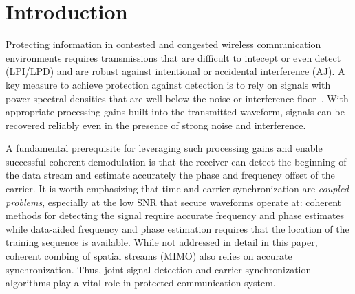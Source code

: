 \section{Introduction}%
\label{sec:introduction}


Protecting information in contested and congested wireless
communication environments requires transmissions that are difficult
to intecept or even detect (LPI/LPD) and are robust against
intentional or accidental interference (AJ).
A key measure to achieve protection against detection is to rely on
signals with power spectral densities that are well below the noise or
interference floor~\cite{Yan_19}.
With appropriate processing gains built into the transmitted waveform, signals can be
recovered reliably even in the presence of strong noise and
interference.

A fundamental prerequisite for leveraging such processing gains and
enable successful coherent demodulation is that the receiver can
detect the beginning of the data stream and estimate accurately the phase and frequency offset of the carrier.
It is worth emphasizing that time and carrier synchronization are
\emph{coupled problems}, especially at the low SNR that secure
waveforms operate at:
coherent methods for detecting the signal require accurate frequency and phase estimates 
while data-aided frequency and phase estimation requires that the
location of the training sequence is available.
While not addressed in detail in this paper, coherent combing of
spatial streams (MIMO) also relies on accurate synchronization.
Thus, joint signal detection and carrier synchronization algorithms
play a vital role in protected communication system.

